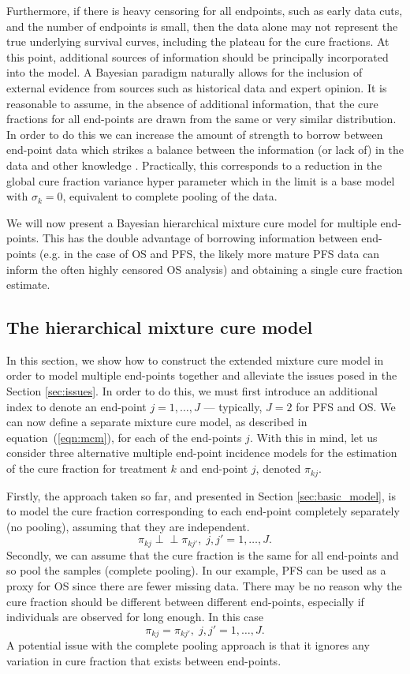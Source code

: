 \documentclass[AMA,STIX1COL]{WileyNJD-v2}
\begin{document}
Furthermore, if there is heavy censoring for all endpoints, such as early data cuts, and the number of endpoints is small, then the data alone may not represent the true underlying survival curves, including the plateau for the cure fractions.
At this point, additional sources of information should be principally incorporated into the model. A Bayesian paradigm naturally allows for the inclusion of external evidence from sources such as historical data and expert opinion. It is reasonable to assume, in the absence of additional information, that the cure fractions for all end-points are drawn from the same or very similar distribution. In order to do this we can increase the amount of strength to borrow between end-point data which strikes a balance between the information (or lack of) in the data and other knowledge \cite{Nikolaidis2021}. Practically, this corresponds to a reduction in the global cure fraction variance hyper parameter which in the limit is a base model with $\sigma_k=0$, equivalent to complete pooling of the data. 

We will now present a Bayesian hierarchical mixture cure model for multiple end-points.
This has the double advantage of borrowing information between end-points
(e.g. in the case of OS and PFS, the likely more mature PFS data can inform the often highly censored OS analysis) and obtaining a single cure fraction estimate.

%
\subsection{The hierarchical mixture cure model} \label{sec:hier_model}
In this section, we show how to construct the extended mixture cure model in order to model multiple end-points together and alleviate the issues posed in the Section \ref{sec:issues}.
In order to do this, we must first introduce an additional index to denote an end-point $j = 1, \ldots, J$ --- typically, $J=2$ for PFS and OS.
We can now define a separate mixture cure model, as described in equation~(\ref{eqn:mcm}), for each of the end-points $j$.
With this in mind, let us consider three alternative multiple end-point incidence models for the estimation of the cure fraction for treatment $k$ and end-point $j$, denoted $\pi_{kj}$.

Firstly, the approach taken so far, and presented in Section \ref{sec:basic_model}, is to model the cure fraction corresponding to each end-point completely separately (no pooling), assuming that they are independent.
$$
\pi_{kj} \perp\!\!\!\perp \pi_{kj'}, \; j,j' = 1, \ldots, J.
$$
Secondly, we can assume that the cure fraction is the same for all end-points and so pool the samples (complete pooling).
In our example, PFS can be used as a proxy for OS since there are fewer missing data.
There may be no reason why the cure fraction should be different between different end-points, especially if individuals are observed for long enough.
In this case
$$
\pi_{kj} = \pi_{kj'}, \; j,j' = 1, \ldots, J.
$$
A potential issue with the complete pooling approach is that it ignores any variation in cure fraction that exists between end-points.
\end{document}
